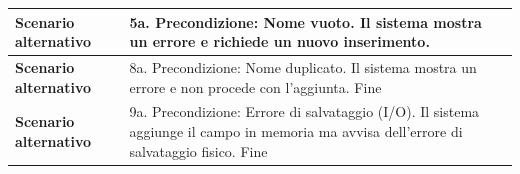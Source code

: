 \documentclass[12pt, a4paper, oneside]{report}
\begin{document}
\begin{tabularx}{\textwidth}{|l|X|}
    \textbf{Scenario alternativo} & 
    5a. Precondizione: Nome vuoto. \newline
    Il sistema mostra un errore e richiede un nuovo inserimento. \\ \hline

    \textbf{Scenario alternativo} & 
    8a. Precondizione: Nome duplicato. \newline
    Il sistema mostra un errore e non procede con l'aggiunta. \newline
    Fine \\ \hline

    \textbf{Scenario alternativo} & 
    9a. Precondizione: Errore di salvataggio (I/O). \newline
    Il sistema aggiunge il campo in memoria ma avvisa dell'errore di salvataggio fisico. \newline
    Fine \\ \hline
\end{tabularx}

\renewcommand{\arraystretch}{1.4} 
\end{document}
